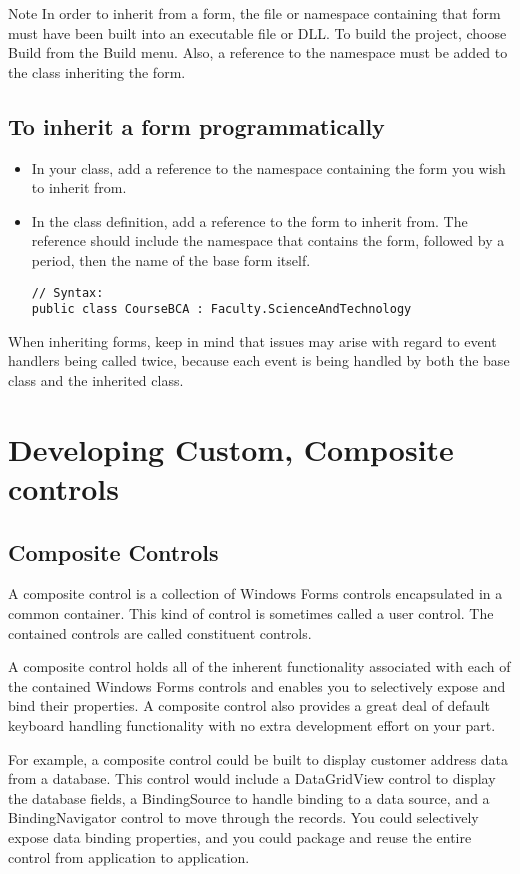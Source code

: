 Note In order to inherit from a form, the file or namespace containing that form must have been
built into an executable file or DLL. To build the project, choose Build from the Build menu. Also,
a reference to the namespace must be added to the class inheriting the form.

\subsection*{To inherit a form programmatically}
\begin{itemize}
	\item In your class, add a reference to the namespace containing the form you wish to inherit from.
	\item In the class definition, add a reference to the form to inherit from. The reference should
	include the namespace that contains the form, followed by a period, then the name of the
	base form itself.

\begin{lstlisting}
// Syntax: 
public class CourseBCA : Faculty.ScienceAndTechnology
\end{lstlisting}

\end{itemize}
When inheriting forms, keep in mind that issues may arise with regard to event handlers being
called twice, because each event is being handled by both the base class and the inherited class.

\section{Developing Custom, Composite controls}

\subsection*{Composite Controls}
A composite control is a collection of Windows Forms controls encapsulated in a common container. This kind of control is sometimes called a user control. The contained controls are called constituent controls.

A composite control holds all of the inherent functionality associated with each of the contained Windows Forms controls and enables you to selectively expose and bind their properties. A composite control also provides a great deal of default keyboard handling functionality with no extra development effort on your part.

For example, a composite control could be built to display customer address data from a database. This control would include a DataGridView control to display the database fields, a BindingSource to handle binding to a data source, and a BindingNavigator control to move through the records. You could selectively expose data binding properties, and you could package and reuse the entire control from application to application.

